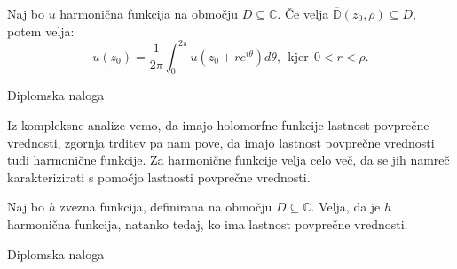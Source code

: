 \documentclass[mat1]{fmfdelo}
\newcommand{\C}{\mathbb C}
\begin{document}
    \begin{trditev}
        Naj bo $u$ harmonična funkcija na območju $D \subseteq \C$. Če velja $\overline{\mathbb{D}}(z_0, \rho) \subseteq D$, potem velja:
            $$
                u(z_0) = \frac{1}{2 \pi} \int_{0}^{2 \pi}{u(z_0 + r e^{i \theta}) d\theta},~~\text{kjer}~~ 0 < r < \rho.
            $$
    \end{trditev}
    \begin{dokaz}
        Diplomska naloga
    \end{dokaz}
    \begin{opomba}
        Iz kompleksne analize vemo, da imajo holomorfne funkcije lastnost povprečne vrednosti, zgornja trditev pa nam pove, da imajo lastnost povprečne vrednosti tudi harmonične funkcije. 
        Za harmonične funkcije velja celo več, da se jih namreč karakterizirati s pomočjo lastnosti povprečne vrednosti. 
    \end{opomba}
    \begin{trditev}
        Naj bo $h$ zvezna funkcija, definirana na območju $D \subseteq \C$. Velja, da je $h$ harmonična funkcija, natanko tedaj, ko ima lastnost povprečne vrednosti.
    \end{trditev}
    \begin{dokaz}
        Diplomska naloga
    \end{dokaz}

\newpage
\end{document}
